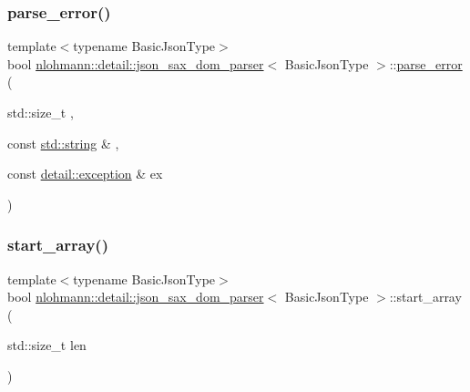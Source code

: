 \mbox{\label{classnlohmann_1_1detail_1_1json__sax__dom__parser_a7d3bf1f361ebb817c694ba45b3814fa6}} 
\subsubsection{\texorpdfstring{parse\+\_\+error()}{parse\_error()}}
{\footnotesize\ttfamily template$<$typename Basic\+Json\+Type$>$ \\
bool \hyperlink{classnlohmann_1_1detail_1_1json__sax__dom__parser}{nlohmann\+::detail\+::json\+\_\+sax\+\_\+dom\+\_\+parser}$<$ Basic\+Json\+Type $>$\+::\hyperlink{classnlohmann_1_1detail_1_1parse__error}{parse\+\_\+error} (\begin{DoxyParamCaption}\item[{std\+::size\+\_\+t}]{,  }\item[{const \hyperlink{namespacenlohmann_1_1detail_a1ed8fc6239da25abcaf681d30ace4985ab45cffe084dd3d20d928bee85e7b0f21}{std\+::string} \&}]{,  }\item[{const \hyperlink{classnlohmann_1_1detail_1_1exception}{detail\+::exception} \&}]{ex }\end{DoxyParamCaption})\hspace{0.3cm}{\ttfamily [inline]}}

\mbox{\label{classnlohmann_1_1detail_1_1json__sax__dom__parser_a056b895d011efaf48ea096c024aca0d4}} 
\subsubsection{\texorpdfstring{start\+\_\+array()}{start\_array()}}
{\footnotesize\ttfamily template$<$typename Basic\+Json\+Type$>$ \\
bool \hyperlink{classnlohmann_1_1detail_1_1json__sax__dom__parser}{nlohmann\+::detail\+::json\+\_\+sax\+\_\+dom\+\_\+parser}$<$ Basic\+Json\+Type $>$\+::start\+\_\+array (\begin{DoxyParamCaption}\item[{std\+::size\+\_\+t}]{len }\end{DoxyParamCaption})\hspace{0.3cm}{\ttfamily [inline]}}

